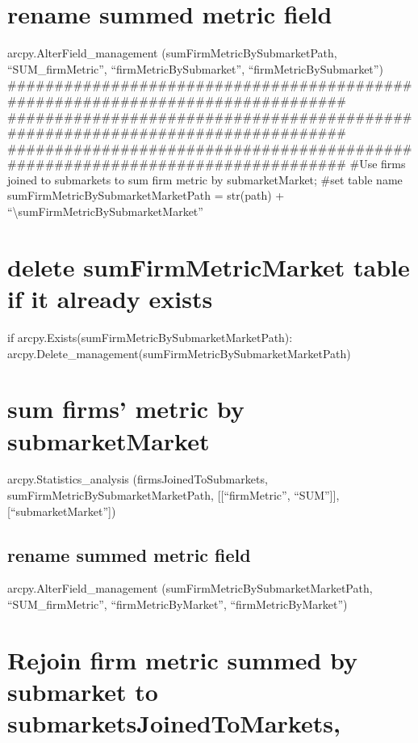 \documentclass[]{article}
\begin{document}
\section{rename summed metric field}\label{rename-summed-metric-field-4}

arcpy.AlterField\_management (sumFirmMetricBySubmarketPath,
``SUM\_firmMetric'', ``firmMetricBySubmarket'',
``firmMetricBySubmarket'')
\#\#\#\#\#\#\#\#\#\#\#\#\#\#\#\#\#\#\#\#\#\#\#\#\#\#\#\#\#\#\#\#\#\#\#\#\#\#\#\#\#\#\#\#\#\#\#\#\#\#\#\#\#\#\#\#\#\#\#\#\#\#\#\#\#\#\#\#\#\#\#\#\#\#\#\#\#\#\#
\#\#\#\#\#\#\#\#\#\#\#\#\#\#\#\#\#\#\#\#\#\#\#\#\#\#\#\#\#\#\#\#\#\#\#\#\#\#\#\#\#\#\#\#\#\#\#\#\#\#\#\#\#\#\#\#\#\#\#\#\#\#\#\#\#\#\#\#\#\#\#\#\#\#\#\#\#\#\#
\#\#\#\#\#\#\#\#\#\#\#\#\#\#\#\#\#\#\#\#\#\#\#\#\#\#\#\#\#\#\#\#\#\#\#\#\#\#\#\#\#\#\#\#\#\#\#\#\#\#\#\#\#\#\#\#\#\#\#\#\#\#\#\#\#\#\#\#\#\#\#\#\#\#\#\#\#\#\#
\#Use firms joined to submarkets to sum firm metric by submarketMarket;
\#set table name sumFirmMetricBySubmarketMarketPath = str(path) +
``\textbackslash{}sumFirmMetricBySubmarketMarket''

\section{delete sumFirmMetricMarket table if it already
exists}\label{delete-sumfirmmetricmarket-table-if-it-already-exists}

if arcpy.Exists(sumFirmMetricBySubmarketMarketPath):
arcpy.Delete\_management(sumFirmMetricBySubmarketMarketPath)

\section{sum firms' metric by
submarketMarket}\label{sum-firms-metric-by-submarketmarket}

arcpy.Statistics\_analysis (firmsJoinedToSubmarkets,
sumFirmMetricBySubmarketMarketPath, {[}{[}``firmMetric'', ``SUM''{]}{]},
{[}``submarketMarket''{]})

\subsection{rename summed metric
field}\label{rename-summed-metric-field-5}

arcpy.AlterField\_management (sumFirmMetricBySubmarketMarketPath,
``SUM\_firmMetric'', ``firmMetricByMarket'', ``firmMetricByMarket'')

\section{Rejoin firm metric summed by submarket to
submarketsJoinedToMarkets,}\label{rejoin-firm-metric-summed-by-submarket-to-submarketsjoinedtomarkets}
\end{document}

